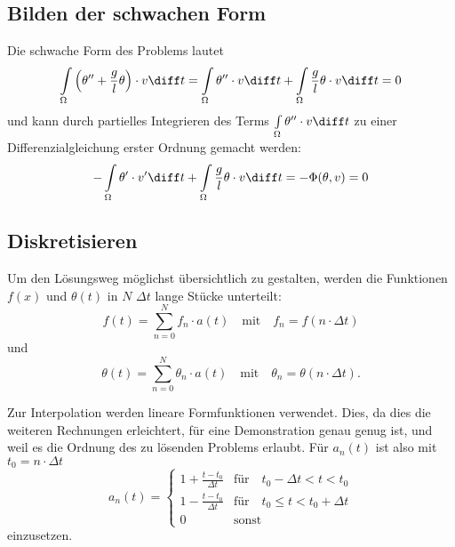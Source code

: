 \subsection{Bilden der schwachen Form}
Die schwache Form des Problems lautet
\begin{equation}
    \int\limits_\Omega \left( \theta'' + \frac{g}{l} \theta \right) \cdot v \diff t 
    = \int\limits_\Omega \theta'' \cdot v \diff t + \int\limits_\Omega \frac{g}{l} \theta \cdot v \diff t
    = 0
\end{equation}
und kann durch partielles Integrieren des Terms $\int\limits_\Omega \theta'' \cdot v \diff t$ zu einer Differenzialgleichung erster Ordnung gemacht werden:
\begin{equation}
    - \int\limits_\Omega \theta' \cdot v' \diff t + \int\limits_\Omega \frac{g}{l} \theta \cdot v \diff t = -\Phi(\theta, v) = 0
    \label{fem:rechenbsp:schwache_form}
\end{equation}


\subsection{Diskretisieren}
Um den Lösungsweg möglichst übersichtlich zu gestalten, werden die Funktionen $f(x)$ und $\theta(t)$ in $N$ $\Delta t$ lange Stücke unterteilt:
\begin{equation}
    f(t) = \sum_{n=0}^{N} f_n \cdot a(t) \quad
    \text{mit} \quad
    f_n = f(n \cdot \Delta t)
\end{equation}
und
\begin{equation}
    \theta(t) = \sum_{n=0}^{N} \theta_n \cdot a(t) \quad
    \text{mit} \quad
    \theta_n = \theta(n \cdot \Delta t).
\end{equation}

Zur Interpolation werden lineare Formfunktionen verwendet.
Dies, da dies die weiteren Rechnungen erleichtert, für eine Demonstration genau genug ist, und weil es die Ordnung des zu lösenden Problems erlaubt.
Für $a_n(t)$ ist also mit $t_0 = n \cdot \Delta t$
\begin{equation}
    a_n(t) = \left\{ \begin{array}{ll}
        1+\frac{t-t_0}{\Delta t} & \text{für} \quad t_0 - \Delta t < t < t_0 \\
        1-\frac{t-t_0}{\Delta t} & \text{für} \quad t_0 \leq t < t_0 + \Delta t \\
        0 & \text{sonst}
    \end{array} \right.
\end{equation}
einzusetzen.


